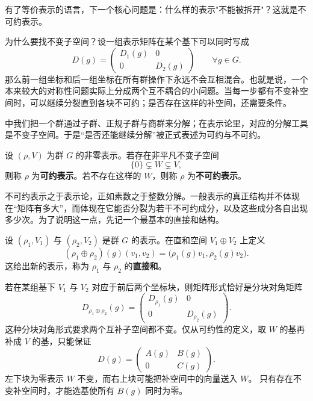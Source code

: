 有了等价表示的语言，下一个核心问题是：什么样的表示"不能被拆开"？这就是不可约表示。


为什么要找不变子空间？设一组表示矩阵在某个基下可以同时写成
\[
D(g)=\begin{pmatrix}D_1(g)&0\\0&D_2(g)\end{pmatrix}
\qquad \forall g\in G.
\]
那么前一组坐标和后一组坐标在所有群操作下永远不会互相混合。也就是说，一个本来较大的对称性问题实际上分成两个互不耦合的小问题。当每一步都有不变补空间时，可以继续分裂直到各块不可约；是否存在这样的补空间，还需要条件。

中我们把一个群通过子群、正规子群与商群来分解；在表示论里，对应的分解工具是不变子空间。于是“是否还能继续分解”被正式表述为可约与不可约。

\begin{definition}[可约表示与不可约表示]
设 $(\rho,V)$ 为群 $G$ 的非零表示。若存在非平凡不变子空间
\[
\{0\}\subsetneq W\subsetneq V,
\]
则称 $\rho$ 为\textbf{可约表示}。若不存在这样的 $W$，则称 $\rho$ 为\textbf{不可约表示}。
\label{def:irreducible}
\end{definition}

不可约表示之于表示论，正如素数之于整数分解。一般表示的真正结构并不体现在“矩阵有多大”，而体现在它能否分裂为若干不可约成分，以及这些成分各自出现多少次。为了说明这一点，先记一个最基本的直接和结构。

\begin{definition}[表示的直接和]
设 $(\rho_1,V_1)$ 与 $(\rho_2,V_2)$ 是群 $G$ 的表示。在直和空间 $V_1\oplus V_2$ 上定义
\[
(\rho_1\oplus \rho_2)(g)(v_1,v_2)=\bigl(\rho_1(g)v_1,\rho_2(g)v_2\bigr).
\]
这给出新的表示，称为 $\rho_1$ 与 $\rho_2$ 的\textbf{直接和}。
\label{def:direct-sum-representation}
\end{definition}

若在某组基下 $V_1$ 与 $V_2$ 对应于前后两个坐标块，则矩阵形式恰好是分块对角矩阵
\[
D_{\rho_1\oplus\rho_2}(g)=
\begin{pmatrix}
D_{\rho_1}(g)&0\\
0&D_{\rho_2}(g)
\end{pmatrix}.
\]
这种分块对角形式要求两个互补子空间都不变。仅从可约性的定义，取 $W$ 的基再补成 $V$ 的基，只能保证
\[
D(g)=\begin{pmatrix}A(g)&B(g)\\0&C(g)\end{pmatrix}.
\]
左下块为零表示 $W$ 不变，而右上块可能把补空间中的向量送入 $W$。
只有存在不变补空间时，才能选基使所有 $B(g)$ 同时为零。

